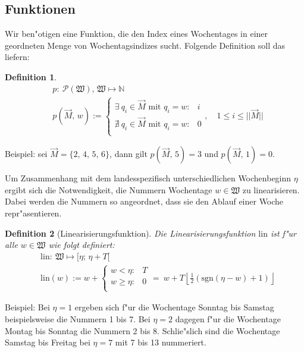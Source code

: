 \documentclass[a4paper]{article}
\newcommand*{\linf}{\mathrm{lin}}
\newcommand*{\sgn}{\mathrm{sgn}}
\newcommand*{\pot}[1]{\mathcal{P}(#1)}
\newcommand*{\wkdays}{\mathfrak{W}}
\numberwithin{equation}{section}
\newtheorem{dfn}{Definition}
\begin{document}
\subsection{Funktionen}
Wir ben"otigen eine Funktion, die den Index eines Wochentages in einer
geordneten Menge von Wochentagsindizes sucht. Folgende Definition soll das
liefern:
\begin{dfn}
  \begin{equation}
  \begin{split}
    & p :\ \pot{\wkdays},\,\wkdays \mapsto \mathbb{N} \\
    & p(\vec{M},\,w) := \left\{\begin{array}{ll}
    \exists\ q_i \in \vec{M} \textrm{ mit } q_i = w : & i \\
    \nexists\ q_i \in \vec{M} \textrm{ mit } q_i = w : & 0 \\
    \end{array}\right.,\quad
    1 \le i \le ||\vec{M}||
  \end{split}
  \end{equation}
\end{dfn}
\noindent Beispiel: sei $\vec{M} = \{2,\,4,\,5,\,6\}$, dann gilt
$p(\vec{M},\,5) = 3$ und $p(\vec{M},\,1) = 0$.

Um Zusammenhang mit dem landesspezifisch unterschiedlichen Wochenbeginn $\eta$
ergibt sich die Notwendigkeit, die Nummern Wochentage $w \in \wkdays$ zu
linearisieren. Dabei werden die Nummern so angeordnet, dass sie den Ablauf einer
Woche repr"asentieren.
\begin{dfn}[Linearisierungsfunktion]\label{def:lin}
  Die Linearisierungsfunktion $\linf$ ist f"ur alle $w \in \wkdays$ wie folgt
  definiert:
  \begin{equation}
  \begin{split}
    & \linf :\ \wkdays \mapsto [\eta;\,\eta + T[ \\
    & \linf(w) := w + \left\{\begin{array}{ll}
        w < \eta : & T \\
        w \ge \eta : & 0 \\
      \end{array}\right. =
      \ w + T\left\lfloor\frac{1}{2}(\sgn(\eta - w) + 1)\right\rfloor
  \end{split}
  \end{equation}
\end{dfn}

\noindent Beispiel: Bei $\eta = 1$ ergeben sich f"ur die Wochentage Sonntag bis
Samstag beispielsweise die Nummern 1 bis 7. Bei $\eta = 2$ dagegen f"ur die
Wochentage Montag bis Sonntag die Nummern 2 bis 8. Schlie"slich sind die
Wochentage Samstag bis Freitag bei $\eta = 7$ mit 7 bis 13 nummeriert.
\end{document}
